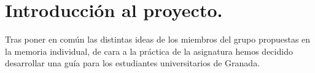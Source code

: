 \section{Introducción al proyecto.}

Tras poner en común las distintas ideas de los miembros del grupo propuestas en la memoria individual, de cara a la práctica de la asignatura hemos decidido desarrollar una guía para los estudiantes universitarios de Granada.
